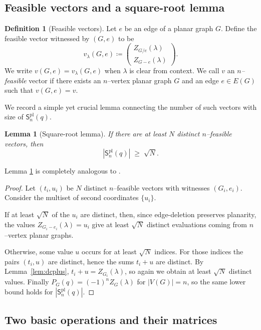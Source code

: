 \documentclass[A4paper,reqno,oneside,12pt]{amsart}
\theoremstyle{plain}
\newtheorem{lemma}[theorem]{Lemma}
\theoremstyle{definition}
\newtheorem{definition}[theorem]{Definition}
\DeclareMathOperator{\pl}{\mathrm{pl}}
\begin{document}
\subsection{Feasible vectors and a square-root lemma}

\begin{definition}[Feasible vectors]\label{def:neg-feasible}
Let $e$ be an edge of a planar graph $G$.  Define the feasible vector witnessed by $(G,e)$ to be
\[
v_\lambda(G,e)\coloneqq
\begin{pmatrix}
Z_{G/e}(\lambda)\\
Z_{G-e}(\lambda)
\end{pmatrix}.
\]
We write $v(G,e)= v_\lambda(G,e)$ when $\lambda$ is clear from context. We call $v$ an \emph{$n$--feasible} vector if there exists an $n$--vertex planar graph $G$ and an edge $e\in E(G)$ such that $v(G,e)=v$. 
\end{definition}

We record a simple yet crucial lemma connecting the number of such vectors with size of $\mathsf{S}^{\pl}_n (q)$. 

\begin{lemma}[Square-root lemma]\label{lem:sqrt-neg}
If there are at least $N$ distinct $n$--feasible vectors, then
\[
|\mathsf{S}^{\pl}_n (q)| \;\ge\; \sqrt{N}.
\]
\end{lemma}

Lemma \ref{lem:sqrt-neg} is completely analogous to \cite[Lemma 2.1]{ABG}. 

\begin{proof}
Let $(t_i,u_i)$ be $N$ distinct $n$--feasible vectors with witnesses $(G_i,e_i)$.
Consider the multiset of second coordinates $\{u_i\}$.

If at least $\sqrt{N}$ of the $u_i$ are distinct, then, since edge-deletion preserves planarity, the values $Z_{G_i-e_i}(\lambda)=u_i$ give at least $\sqrt{N}$ distinct evaluations coming from $n$--vertex planar graphs.

Otherwise, some value $u$ occurs for at least $\sqrt{N}$ indices.  For those indices the pairs $(t_i,u)$ are distinct, hence the sums $t_i+u$ are distinct.
By Lemma~\ref{lem:dcplus}, $t_i+u = Z_{G_i}(\lambda)$, so again we obtain at least $\sqrt{N}$ distinct values.
Finally $P_G(q)=(-1)^n Z_G(\lambda)$ for $|V(G)|=n$, so the same lower bound holds for $|\mathsf{S}_n^{\pl} (q)|$.
\end{proof}

\subsection{Two basic operations and their matrices}
\end{document}
